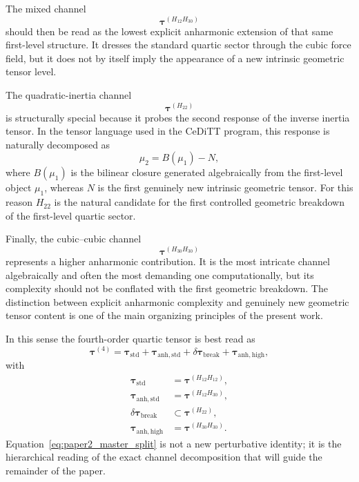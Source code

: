 \documentclass[aip,jcp,reprint]{revtex4-2}
\begin{document}
The mixed channel
\begin{equation}
\bm{\tau}^{(H_{12}H_{30})}
\end{equation}
should then be read as the lowest explicit anharmonic extension of that same
first-level structure.  It dresses the standard quartic sector through the
cubic force field, but it does not by itself imply the appearance of a new
intrinsic geometric tensor level.

The quadratic-inertia channel
\begin{equation}
\bm{\tau}^{(H_{22})}
\end{equation}
is structurally special because it probes the second response of the inverse
inertia tensor.  In the tensor language used in the CeDiTT program, this
response is naturally decomposed as
\begin{equation}
\mu_2 = B(\mu_1) - N,
\end{equation}
where $B(\mu_1)$ is the bilinear closure generated algebraically from the
first-level object $\mu_1$, whereas $N$ is the first genuinely new intrinsic
geometric tensor.  For this reason $H_{22}$ is the natural candidate for the
first controlled geometric breakdown of the first-level quartic sector.

Finally, the cubic--cubic channel
\begin{equation}
\bm{\tau}^{(H_{30}H_{30})}
\end{equation}
represents a higher anharmonic contribution.  It is the most intricate
channel algebraically and often the most demanding one computationally, but
its complexity should not be conflated with the first geometric breakdown.
The distinction between explicit anharmonic complexity and genuinely new
geometric tensor content is one of the main organizing principles of the
present work.

In this sense the fourth-order quartic tensor is best read as
\begin{equation}
\bm{\tau}^{(4)}
=
\bm{\tau}_{\mathrm{std}}
+
\bm{\tau}_{\mathrm{anh,std}}
+
\delta\bm{\tau}_{\mathrm{break}}
+
\bm{\tau}_{\mathrm{anh,high}},
\label{eq:paper2_master_split}
\end{equation}
with
\begin{align}
\bm{\tau}_{\mathrm{std}} &= \bm{\tau}^{(H_{12}H_{12})}, \\
\bm{\tau}_{\mathrm{anh,std}} &= \bm{\tau}^{(H_{12}H_{30})}, \\
\delta\bm{\tau}_{\mathrm{break}} &\subset \bm{\tau}^{(H_{22})}, \\
\bm{\tau}_{\mathrm{anh,high}} &= \bm{\tau}^{(H_{30}H_{30})}.
\end{align}
Equation~\eqref{eq:paper2_master_split} is not a new perturbative identity;
it is the hierarchical reading of the exact channel decomposition that will
guide the remainder of the paper.
\end{document}
